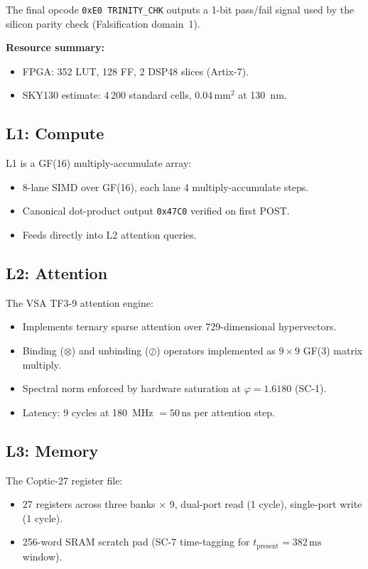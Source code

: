 The final opcode \texttt{0xE0 TRINITY\_CHK} outputs a 1-bit pass/fail signal
used by the silicon parity check (Falsification domain~1).

\textbf{Resource summary:}
\begin{itemize}
  \item FPGA: 352 LUT, 128 FF, 2 DSP48 slices (Artix-7).
  \item SKY130 estimate: 4\,200 standard cells, \(0.04\,\text{mm}^2\) at 130~nm.
\end{itemize}

\subsection{L1: Compute}

L1 is a GF(16) multiply-accumulate array:
\begin{itemize}
  \item 8-lane SIMD over GF(16), each lane 4 multiply-accumulate steps.
  \item Canonical dot-product output \texttt{0x47C0} verified on first POST.
  \item Feeds directly into L2 attention queries.
\end{itemize}

\subsection{L2: Attention}

The VSA TF3-9 attention engine:
\begin{itemize}
  \item Implements ternary sparse attention over 729-dimensional hypervectors.
  \item Binding (\(\otimes\)) and unbinding (\(\oslash\)) operators implemented
        as \(9\times9\) GF(3) matrix multiply.
  \item Spectral norm enforced by hardware saturation at \(\varphi = 1.6180\) (SC-1).
  \item Latency: 9 cycles at 180~MHz \(= 50\,\text{ns}\) per attention step.
\end{itemize}

\subsection{L3: Memory}

The Coptic-27 register file:
\begin{itemize}
  \item 27 registers across three banks \(\times\) 9, dual-port read (1 cycle),
        single-port write (1 cycle).
  \item 256-word SRAM scratch pad (SC-7 time-tagging for
        \(t_{\text{present}} = 382\,\text{ms}\) window).
\end{itemize}

